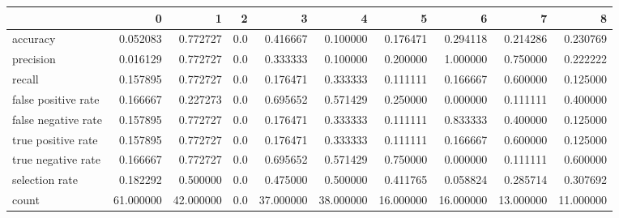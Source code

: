 \begin{tabular}{lrrrrrrrrr}
\toprule
{} &          0 &          1 &    2 &          3 &          4 &          5 &          6 &          7 &          8 \\
\midrule
accuracy            &   0.052083 &   0.772727 &  0.0 &   0.416667 &   0.100000 &   0.176471 &   0.294118 &   0.214286 &   0.230769 \\
precision           &   0.016129 &   0.772727 &  0.0 &   0.333333 &   0.100000 &   0.200000 &   1.000000 &   0.750000 &   0.222222 \\
recall              &   0.157895 &   0.772727 &  0.0 &   0.176471 &   0.333333 &   0.111111 &   0.166667 &   0.600000 &   0.125000 \\
false positive rate &   0.166667 &   0.227273 &  0.0 &   0.695652 &   0.571429 &   0.250000 &   0.000000 &   0.111111 &   0.400000 \\
false negative rate &   0.157895 &   0.772727 &  0.0 &   0.176471 &   0.333333 &   0.111111 &   0.833333 &   0.400000 &   0.125000 \\
true positive rate  &   0.157895 &   0.772727 &  0.0 &   0.176471 &   0.333333 &   0.111111 &   0.166667 &   0.600000 &   0.125000 \\
true negative rate  &   0.166667 &   0.772727 &  0.0 &   0.695652 &   0.571429 &   0.750000 &   0.000000 &   0.111111 &   0.600000 \\
selection rate      &   0.182292 &   0.500000 &  0.0 &   0.475000 &   0.500000 &   0.411765 &   0.058824 &   0.285714 &   0.307692 \\
count               &  61.000000 &  42.000000 &  0.0 &  37.000000 &  38.000000 &  16.000000 &  16.000000 &  13.000000 &  11.000000 \\
\bottomrule
\end{tabular}

